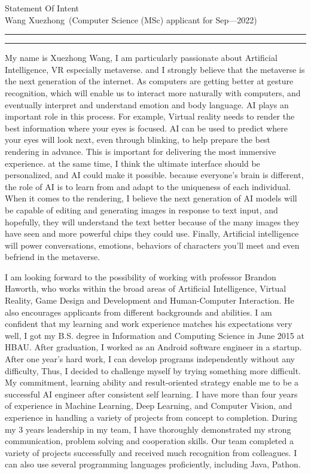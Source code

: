 \documentclass[12pt]{article}
\newcommand{\soptitle}{Statement Of Intent}
\newcommand{\yourname}{Wang Xuezhong}
\begin{document}
\begin{center}\LARGE\soptitle\\
\large \yourname\ (Computer Science (MSc) applicant for Sep---2022)
\end{center}

\hrule
\vspace{1pt}
\hrule height 1pt

\sffamily
\mdseries

\bigskip


My name is Xuezhong Wang, I am particularly passionate about Artificial Intelligence, VR especially metaverse. and I strongly believe that the metaverse is the next generation of the internet. As computers are getting better at gesture recognition, which will enable us to interact more naturally with computers, and eventually interpret and understand emotion and body language. AI plays an important role in this process. For example, Virtual reality needs to render the best information where your eyes is focused. AI can be used to predict where your eyes will look next, even through blinking, to help prepare the best rendering in advance. This is important for delivering the most immersive experience. at the same time, I think the ultimate interface should be personalized, and AI could make it possible. because everyone’s brain is different, the role of AI is to learn from and adapt to the uniqueness of each individual. When it comes to the rendering, I believe the next generation of AI models will be capable of editing and generating images in response to text input, and hopefully, they will understand the text better because of the many images they have seen and more powerful chips they could use. Finally, Artificial intelligence will power conversations, emotions, behaviors of characters you'll meet and even befriend in the metaverse.

\bigskip

I am looking forward to the possibility of working with professor Brandon Haworth, who works within the broad areas of Artificial Intelligence, Virtual Reality, Game Design and Development and Human-Computer Interaction. He also encourages applicants from different backgrounds and abilities. I am confident that my learning and work experience matches his expectations very well, I got my B.S. degree in Information and Computing Science in June 2015 at HBAU. After graduation, I worked as an Android software engineer in a startup. After one year's hard work, I can develop programs independently without any difficulty, Thus, I decided to challenge myself by trying something more difficult. My commitment, learning ability and result-oriented strategy enable me to be a successful AI engineer after consistent self learning. I have more than four years of experience in Machine Learning, Deep Learning, and Computer Vision, and experience in handling a variety of projects from concept to completion. During my 3 years leadership in my team, I have thoroughly demonstrated my strong communication, problem solving and cooperation skills. Our team completed a variety of projects successfully and received much recognition from colleagues. I can also use several programming languages proficiently, including Java, Pathon.
\end{document}
